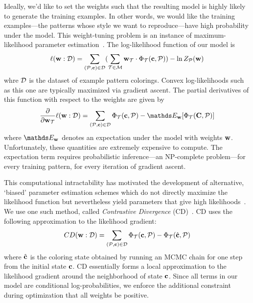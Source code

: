 Ideally, we'd like to set the weights such that the resulting model is highly likely to generate the training examples. In other words, we would like the training examples---the patterns whose style we want to reproduce---have high probability under the model. This weight-tuning problem is an instance of maximum-likelihood parameter estimation~\cite{PGMBook}. The log-likelihood function of our model is
\begin{equation*}
\ell(\mathbf{w} : \mathcal{D}) =
	\sum_{(\mathcal{P}, \mathbf{c}) \in \mathcal{D}}
	(
		\sum_{\mathcal{T} \in \mathcal{M}}
			\mathbf{w}_{\mathcal{T}} \cdot \Phi_{\mathcal{T}}(\mathbf{c}, \mathcal{P})
	)			
		- \ln{Z_{\mathcal{P}}(\mathbf{w})}
\end{equation*}
whre $\mathcal{D}$ is the dataset of example pattern colorings. Convex log-likelihoods such as this one are typically maximized via gradient ascent. The partial derivatives of this function with respect to the weights are given by
\begin{equation*}
\frac{\partial}{\partial \weights_\term} \ell(\weights : \dataset) = 
	\sum_{(\pattern, \colors) \in \dataset}
			\termStats(\colors, \pattern)
		- \expectation_\weights[\termStats(\colorVars, \pattern)]
\end{equation*}
where $\expectation_\weights$ denotes an expectation under the model with weights $\mathbf{w}$. Unfortunately, these quantities are extremely expensive to compute. The expectation term requires probabilistic inference---an NP-complete problem---for every training pattern, for every iteration of gradient ascent.

This computational intractability has motivated the development of alternative, `biased' parameter estimation schemes which do not directly maximize the likelihood function but nevertheless yield parameters that give high likelihoods~\cite{NonMLEParameterEstimation}. We use one such method, called \emph{Contrastive Divergence} (CD)~\cite{ContrastiveDivergence}. CD uses the following approximation to the likelihood gradient:
\begin{equation*}
CD(\mathbf{w} : \mathcal{D}) = 
	\sum_{(\mathcal{P}, \mathbf{c}) \in \mathcal{D}}
			\Phi_{\mathcal{T}}(\mathbf{c}, \mathcal{P})
		 -\Phi_{\mathcal{T}}(\hat{\mathbf{c}}, \mathcal{P})
\end{equation*}
where $\hat{\mathbf{c}}$ is the coloring state obtained by running an MCMC chain for one step from the initial state $\mathbf{c}$. CD essentially forms a local approximation to the likelihood gradient around the neighborhood of state $\mathbf{c}$. Since all terms in our model are conditional log-probabilities, we enforce the additional constraint during optimization that all weights be positive.~

